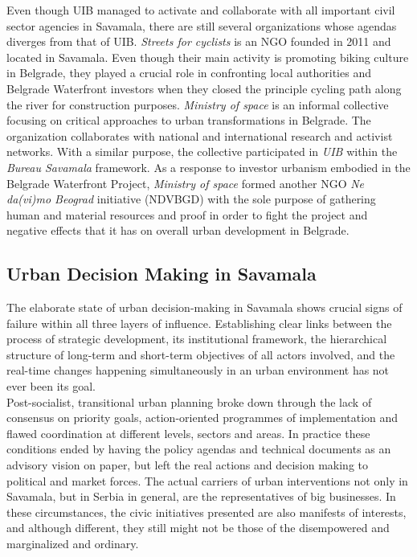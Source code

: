 \documentclass[11pt]{report}
\begin{document}
Even though UIB managed to activate and collaborate with all important civil sector agencies in Savamala, there are still several organizations whose agendas diverges from that of UIB.
\textit{Streets for cyclists} is an NGO founded in 2011 and located in Savamala.
Even though their main activity is promoting biking culture in Belgrade, they played a crucial role in confronting local authorities and Belgrade Waterfront investors when they closed the principle cycling path along the river for construction purposes. 
\textit{Ministry of space} is an informal collective focusing on critical approaches to urban transformations in Belgrade.
The organization collaborates with national and international research and activist networks.  With a similar purpose, the collective participated in \textit{UIB} within the \textit{Bureau Savamala} framework.
As a response to investor urbanism embodied in the Belgrade Waterfront Project, \textit{Ministry of space} formed another NGO \textit{Ne da(vi)mo Beograd} initiative (NDVBGD) with the sole purpose of gathering human and material resources and proof in order to fight the project and negative effects that it has on overall urban development in Belgrade.

\subsection{Urban Decision Making in Savamala}

The elaborate state of urban decision-making in Savamala shows  crucial signs of failure within all three layers of influence. Establishing clear links between the process of strategic development, its institutional framework, the hierarchical structure of long-term and short-term objectives of all actors involved, and the real-time changes happening simultaneously in an urban environment has not ever been its goal.
\\

Post-socialist, transitional urban planning broke down through the lack of consensus on priority goals, action-oriented programmes of implementation and flawed coordination at different levels, sectors and areas. In practice these conditions ended by having the policy agendas and technical documents as an advisory vision on paper, but left the real actions and decision making to political and market forces. The actual carriers of urban interventions not only in Savamala, but in Serbia in general, are the representatives of big businesses. In these circumstances, the civic initiatives presented are also manifests of interests, and although different, they still might not be those of the disempowered and marginalized and ordinary.
\\
\end{document}
